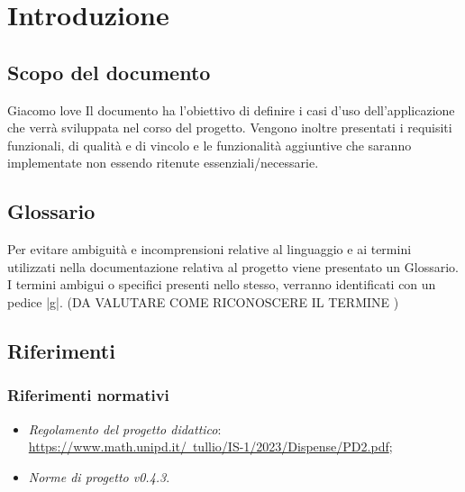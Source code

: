 \documentclass[10pt, a4paper]{article}
\title{\titolo}
\author{SWEetCode}
\begin{document}



\newpage

\tableofcontents
\newpage

\section{Introduzione}
\subsection{Scopo del documento}
Giacomo love
Il documento ha l'obiettivo di definire i casi d'uso dell'applicazione che verrà sviluppata nel corso del progetto. Vengono inoltre presentati i requisiti funzionali, di qualità e di vincolo e le funzionalità aggiuntive che saranno implementate non essendo ritenute essenziali/necessarie.
\\
\subsection{Glossario}
Per evitare ambiguità e incomprensioni relative al linguaggio e ai termini utilizzati nella documentazione relativa al progetto viene presentato un Glossario.
I termini ambigui o specifici presenti nello stesso, verranno identificati con un pedice |g|. (DA VALUTARE COME RICONOSCERE IL TERMINE )
\\
\subsection{Riferimenti}
   \subsubsection{Riferimenti normativi}
   \begin{itemize}
    \item \textit{Regolamento del progetto didattico}: \\
    \href{https://www.math.unipd.it/~tullio/IS-1/2023/Dispense/PD2.pdf}{https://www.math.unipd.it/~tullio/IS-1/2023/Dispense/PD2.pdf};
    \item \textit{Norme di progetto v0.4.3}.
    \end{itemize}
    
\end{document}
